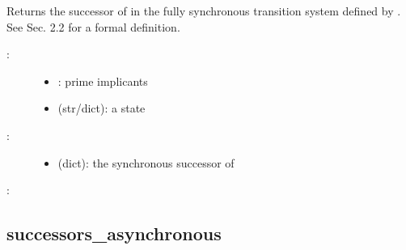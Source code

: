 \documentclass[letterpaper,10pt,english]{sphinxmanual}
\begin{document}
\begin{fulllineitems}
\label{\detokenize{StateTransitionGraphs:PyBoolNet.StateTransitionGraphs.successor_synchronous}}
Returns the successor of  in the fully synchronous transition system defined by .
See {\hyperref[\detokenize{Bibliography:klarner2015approx}]{}} Sec. 2.2 for a formal definition.
\begin{description}
\item[{:}] \leavevmode\begin{itemize}
\item {} 
: prime implicants

\item {} 
 (str/dict): a state

\end{itemize}

\item[{:}] \leavevmode\begin{itemize}
\item {} 
 (dict): the synchronous successor of 

\end{itemize}

\end{description}

:

\begin{sphinxVerbatim}[commandchars=\\\{\}]
  
 
\end{sphinxVerbatim}

\end{fulllineitems}



\subsection{successors\_asynchronous}
\label{\detokenize{StateTransitionGraphs:successors-asynchronous}}\label{\detokenize{StateTransitionGraphs:id4}}
\end{document}
